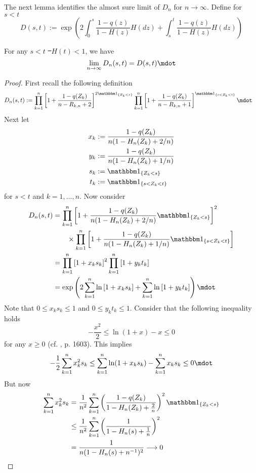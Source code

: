 %
The next lemma identifies the almost sure limit of $D_n$ for $n\to\infty$. Define for $s<t$
$$D(s,t) := \exp\left(2\int_{0}^{s} \frac{1-q(z)}{1-H(z)} H(dz) + \int_{s}^{t} \frac{1-q(z)}{1-H(z)} H(dz)\right)$$
\begin{lemma} \label{lem:dn_limit}
	For any $s < t$ \st\ $H(t)<1$, we have
	$$\lim\limits_{n\to\infty}D_n(s,t) = D(s,t)\mdot$$
	\begin{proof}
		First recall the following definition
		\begin{align*}
			D_n(s,t) &:= \prod_{k=1}^{n} \left[1+\frac{1-q(Z_k)}{n-R_{k,n} +2}\right]^{2\I{Z_k<s}} \prod_{k=1}^{n}\left[1+\frac{1-q(Z_k)}{n-R_ {k,n}+1}\right]^{\I{s < Z_k < t}} \mdot
		\end{align*}
		Next let 
		\begin{align*}
		x_k &:= \frac{1-q(Z_k)}{n(1- H_n(Z_k) + 2/n)}\\
		y_k &:= \frac{1-q(Z_k)}{n(1- H_n(Z_k) + 1/n)}\\
		s_k &:= \I{Z_k < s} \\
		t_k &:= \I{s < Z_k < t}
		\end{align*}
		for $s<t$ and $k=1,\dots,n$.
		Now consider 
		\begin{align*}
			D_n(s,t) &= \prod_{k=1}^{n} \left[1+\frac{1-q(Z_k)}{n(1- H_n(Z_k) + 2/n)}\I{Z_k<s}\right]^{2}\\ 
			&\qquad \times \prod_{k=1}^{n}\left[1+\frac{1-q(Z_k)}{n(1-H_n(Z_k)+1/n)}\I{s < Z_k < t}\right]\\
			&= \prod_{k=1}^{n} \left[1+x_k s_k\right]^{2} \prod_{k=1}^{n}\left[1+y_k t_k\right]\\
			&= \exp\left(2\sum_{k=1}^{n}\ln\left[1+x_k s_k\right] + \sum_{k=1}^{n}\ln\left[1+y_k t_k\right]\right)\mdot
		\end{align*}
		Note that $0 \leq x_k s_k \leq 1$ and $0 \leq y_k t_k \leq 1$. Consider that the following inequality holds  
		$$-\frac{x^2}{2} \leq \ln(1+x) - x \leq 0$$ 
		for any $x \geq 0$ (cf.  \cite{stute1993strong}, p. 1603). This implies 
		$$-\frac{1}{2}\sum_{k=1}^{n}x_k^2 s_k \leq \sum_{k=1}^{n}\ln(1+x_k s_k) - \sum_{k=1}^{n}x_k s_k \leq 0\mdot$$ 
		But now 
		\begin{align*}
			\sum_{k=1}^{n} x_k^2 s_k &= \frac{1}{n^2} \sum_{k=1}^{n} \left(\frac{1-q(Z_k)}{1-H_n(Z_k)+\frac{2}{n}}\right)^2\I{Z_k<s}\\
			&\leq \frac{1}{n^2} \sum_{k=1}^{n} \left(\frac{1}{1-H_n(s)+\frac{1}{n}}\right)^2\\
			&= \frac{1}{n(1-H_n(s)+n^{-1})^2} \longrightarrow 0

\end{align*}
\end{proof}
\end{lemma}
